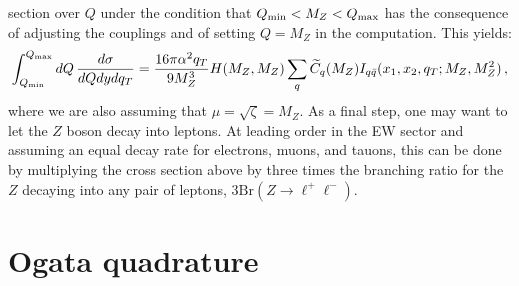 \documentclass[10pt,a4paper]{article}
\begin{document}
section over $Q$ under the condition that
$Q_{\rm min}<M_Z<Q_{\rm max}$ has the consequence of adjusting the
couplings and of setting $Q=M_Z$ in the computation. This yields:
\begin{equation}
\int_{Q_{\rm min}}^{Q_{\rm max}}dQ\,\frac{d\sigma}{dQ dy dq_T} =
 \frac{16\pi\alpha^2q_T}{9 M_Z^3} H(M_Z,M_Z) \sum_q \widetilde{C}_q(M_Z)
  I_{q\bar{q}}(x_1,x_2,q_T;M_Z,M_Z^2)\,,
\end{equation}
where we are also assuming that $\mu=\sqrt{\zeta}=M_Z$. As a final
step, one may want to let the $Z$ boson decay into leptons. At leading
order in the EW sector and assuming an equal decay rate for electrons,
muons, and tauons, this can be done by multiplying the cross section
above by three times the branching ratio for the $Z$ decaying into any
pair of leptons, $3\mbox{Br}(Z\rightarrow \ell^+\ell^-)$.

\appendix

\section{Ogata quadrature}\label{app:OgataQuadrature}
\end{document}
